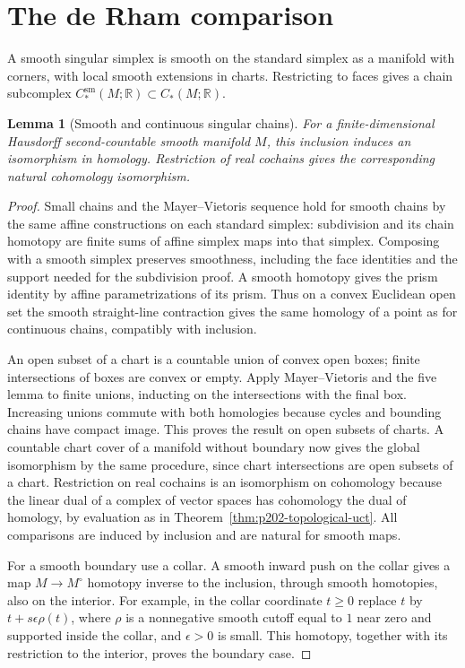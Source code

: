 \documentclass[11pt,oneside,openany]{book}
\theoremstyle{plain}
\newtheorem{lemma}[theorem]{Lemma}
\theoremstyle{definition}
\theoremstyle{remark}
\begin{document}
\section{The de Rham comparison}\label{p202:T33}

A smooth singular simplex is smooth on the standard simplex
as a manifold with corners, with local smooth extensions in
charts. Restricting to faces gives a chain subcomplex
\(C_*^{\mathrm{sm}}(M;\mathbb R)\subset C_*(M;\mathbb R)\).

\begin{lemma}[Smooth and continuous singular chains]
\label{lem:p202-smooth-singular}
For a finite-dimensional Hausdorff second-countable smooth
manifold \(M\), this inclusion induces an isomorphism in
homology. Restriction of real cochains gives the corresponding
natural cohomology isomorphism.
\end{lemma}
\begin{proof}
Small chains and the Mayer--Vietoris sequence hold for
smooth chains by the same affine constructions on each
standard simplex: subdivision and its chain homotopy are
finite sums of affine simplex maps into that simplex.
Composing with a smooth simplex preserves smoothness,
including the face identities and the support needed for
the subdivision proof. A smooth homotopy gives the prism
identity by affine parametrizations of its prism. Thus on
a convex Euclidean open set the smooth straight-line
contraction gives the same homology of a point as for
continuous chains, compatibly with inclusion.

An open subset of a chart is a countable union of convex
open boxes; finite intersections of boxes are convex or
empty. Apply Mayer--Vietoris and the five lemma to finite
unions, inducting on the intersections with the final box.
Increasing unions commute with both homologies because
cycles and bounding chains have compact image. This proves
the result on open subsets of charts. A countable chart
cover of a manifold without boundary now gives the global
isomorphism by the same procedure, since chart intersections
are open subsets of a chart. Restriction on real cochains
is an isomorphism on cohomology because the linear dual
of a complex of vector spaces has cohomology the dual of
homology, by evaluation as in
Theorem~\ref{thm:p202-topological-uct}. All comparisons
are induced by inclusion and are natural for smooth maps.

For a smooth boundary use a collar. A smooth inward
push on the collar gives a map \(M\to M^\circ\) homotopy
inverse to the inclusion, through smooth homotopies,
also on the interior. For example, in the collar coordinate
\(t\geq0\) replace \(t\) by \(t+s\epsilon\rho(t)\), where
\(\rho\) is a nonnegative smooth cutoff equal to \(1\) near
zero and supported inside the collar, and \(\epsilon>0\)
is small. This homotopy, together with its restriction
to the interior, proves the boundary case.
\end{proof}
\end{document}
